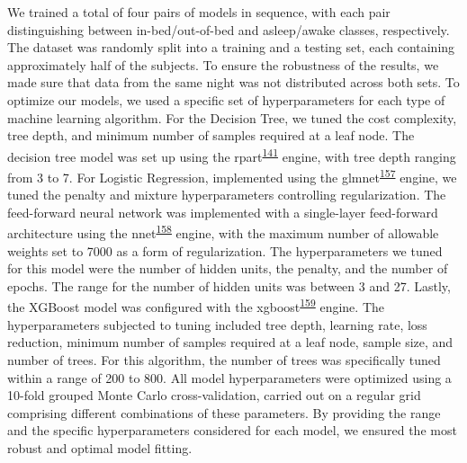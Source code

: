 \documentclass[
  10pt,
]{scrbook}
\begin{document}
We trained a total of four pairs of models in sequence, with each pair
distinguishing between in-bed/out-of-bed and asleep/awake classes,
respectively. The dataset was randomly split into a training and a
testing set, each containing approximately half of the subjects. To
ensure the robustness of the results, we made sure that data from the
same night was not distributed across both sets. To optimize our models,
we used a specific set of hyperparameters for each type of machine
learning algorithm. For the Decision Tree, we tuned the cost complexity,
tree depth, and minimum number of samples required at a leaf node. The
decision tree model was set up using the
rpart\textsuperscript{\protect\hyperlink{ref-rpart}{141}} engine, with
tree depth ranging from 3 to 7. For Logistic Regression, implemented
using the
glmnet\textsuperscript{\protect\hyperlink{ref-friedman_glmnet_2010}{157}}
engine, we tuned the penalty and mixture hyperparameters controlling
regularization. The feed-forward neural network was implemented with a
single-layer feed-forward architecture using the
nnet\textsuperscript{\protect\hyperlink{ref-nnet}{158}} engine, with the
maximum number of allowable weights set to 7000 as a form of
regularization. The hyperparameters we tuned for this model were the
number of hidden units, the penalty, and the number of epochs. The range
for the number of hidden units was between 3 and 27. Lastly, the XGBoost
model was configured with the
xgboost\textsuperscript{\protect\hyperlink{ref-xgboost}{159}} engine.
The hyperparameters subjected to tuning included tree depth, learning
rate, loss reduction, minimum number of samples required at a leaf node,
sample size, and number of trees. For this algorithm, the number of
trees was specifically tuned within a range of 200 to 800. All model
hyperparameters were optimized using a 10-fold grouped Monte Carlo
cross-validation, carried out on a regular grid comprising different
combinations of these parameters. By providing the range and the
specific hyperparameters considered for each model, we ensured the most
robust and optimal model fitting.
\end{document}
